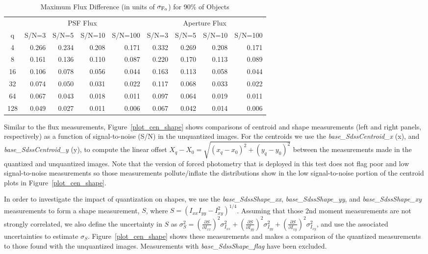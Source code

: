 \begin{table}[ht]
\caption{Maximum Flux Difference (in units of $\sigma_{\rm F_0}$) for 90\% of Objects}
\centering
\begin{tabular}[]{c|rrrr|rrrr}
\hline
     &  \multicolumn{4}{c}{PSF Flux}  & \multicolumn{4}{c}{Aperture Flux} \\
 q   &  S/N=3 & S/N=5 & S/N=10 & S/N=100 & S/N=3 & S/N=5 & S/N=10 & S/N=100  \\
\hline
   4 &  0.266 & 0.234 & 0.208  & 0.171 &   0.332 & 0.269 & 0.208 & 0.171 \\
   8 &  0.161 & 0.136 & 0.110  & 0.087 &   0.220 & 0.170 & 0.113 & 0.089 \\
  16 &  0.106 & 0.078 & 0.056  & 0.044 &   0.163 & 0.113 & 0.058 & 0.044 \\
  32 &  0.074 & 0.050 & 0.031  & 0.022 &   0.117 & 0.068 & 0.033 & 0.022 \\
  64 &  0.067 & 0.043 & 0.018  & 0.011 &   0.097 & 0.064 & 0.019 & 0.011 \\
 128 &  0.049 & 0.027 & 0.011  & 0.006 &   0.067 & 0.042 & 0.014 & 0.006 \\
\hline
\end{tabular}
\label{tab_se_flux_diff}
\end{table}


Similar to the flux measurements, Figure~\ref{plot_cen_shape} shows comparisons of centroid
and shape measurements (left and right panels, respectively) as a function of signal-to-noise
(S/N) in the unquantized images.  For the centroids we use the {\it base\_SdssCentroid\_x} (x), and 
{\it base\_SdssCentroid\_y} (y), to compute the linear offset 
$X_q-X_0 = \sqrt{ (x_q-x_0)^2 + (y_q-y_0)^2}$ between the measurements
made in the quantized and unquantized images.  Note that the version of forced photometry that is 
deployed in this test does not flag poor and low signal-to-noise measurements so those measurements 
pollute/inflate the distributions show in the low signal-to-noise portion of the centroid plots 
in Figure~\ref{plot_cen_shape}.

In order to investigate the impact of quantization on shapes, we use the {\it base\_SdssShape\_xx}, 
{\it base\_SdssShape\_yy}, and {\it base\_SdssShape\_xy} measurements to form a shape measurement, 
$S$, where $S=(I_{xx} I_{yy} - I_{xy}^2)^{1/4}$.
Assuming that those 2nd moment measurements are not strongly correlated, we also define
the uncertainty in $S$ as 
$\sigma_S^2 = (\frac{\partial S}{\partial I_{xx}})^2 \sigma_{I_{xx}}^2 + 
(\frac{\partial S}{\partial I_{yy}})^2 \sigma_{I_{yy}}^2 + 
(\frac{\partial S}{\partial I_{xy}})^2 \sigma_{I_{xy}}^2$, and use the associated uncertainties
to estimate $\sigma_S$.  Figure~\ref{plot_cen_shape} shows these measurements and makes a comparison
of the quantized measurements to those found with the unquantized images.  Measurements with 
{\it base\_SdssShape\_flag} have been excluded.

